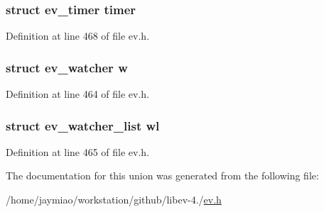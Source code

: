\hypertarget{unionev__any__watcher_af2da8c0826c21eddd57a904ce5db7411}{
\subsubsection[{timer}]{\setlength{\rightskip}{0pt plus 5cm}struct {\bf ev\-\_\-timer} {\bf timer}}}\label{unionev__any__watcher_af2da8c0826c21eddd57a904ce5db7411}


\-Definition at line 468 of file ev.\-h.

\hypertarget{unionev__any__watcher_a9516a8125893e72f22e7012717dad6d8}{
\subsubsection[{w}]{\setlength{\rightskip}{0pt plus 5cm}struct {\bf ev\-\_\-watcher} {\bf w}}}\label{unionev__any__watcher_a9516a8125893e72f22e7012717dad6d8}


\-Definition at line 464 of file ev.\-h.

\hypertarget{unionev__any__watcher_ae2011b7703dba910528f85c51f9e2214}{
\subsubsection[{wl}]{\setlength{\rightskip}{0pt plus 5cm}struct {\bf ev\-\_\-watcher\-\_\-list} {\bf wl}}}\label{unionev__any__watcher_ae2011b7703dba910528f85c51f9e2214}


\-Definition at line 465 of file ev.\-h.



\-The documentation for this union was generated from the following file\-:\begin{DoxyCompactItemize}
\item 
/home/jaymiao/workstation/github/libev-\/4./\hyperlink{ev_8h}{ev.\-h}\end{DoxyCompactItemize}
